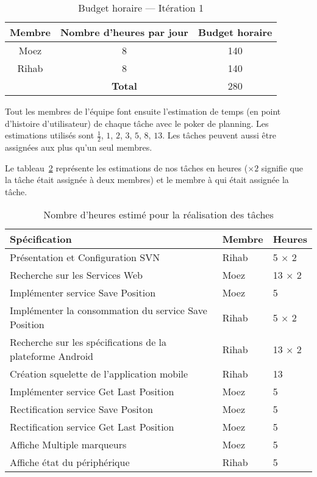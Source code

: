\begin{table}[H]
    \centering
    \begin{tabular}{| c | c | c |}
        \hline
        \textbf{Membre} & \textbf{Nombre d'heures par jour} & \textbf{Budget horaire} \\ \hline
        \hline

Moez & 8 & 140\\ \hline
Rihab & 8 & 140 \\ \hline
\multicolumn{1}{c|}{} & \textbf{Total} & 280 \\ \cline{2-3}
    \end{tabular}
    \caption{Budget horaire --- Itération 1}
\label{tab:sprint1-capacity}
\end{table}

Tout les membres de l'équipe font ensuite l'estimation de temps (en point
d'histoire d'utilisateur) de chaque tâche avec le poker de planning. Les
estimations utilisés sont $\frac{1}{2}$, $1$, $2$, $3$, $5$, $8$, $13$. Les
tâches peuvent aussi être assignées aux plus qu'un seul membres.

Le tableau~\ref{tab:sprint1-estimation} représente les estimations de nos
tâches en heures ($\times2$ signifie que la tâche était assignée à deux membres)
et le membre à qui était assignée la tâche.

\begin{table}[H]
    \begin{tabular}{| l | l | l |}
        \hline
        \textbf{Spécification} & \textbf{Membre} & \textbf{Heures} \\ \hline
        \hline
Présentation et Configuration SVN & Rihab & 5 $\times$ 2 \\ \hline
Recherche sur les Services Web & Moez & 13 $\times$ 2 \\ \hline
Implémenter service Save Position & Moez & 5 \\ \hline
Implémenter la consommation du service Save Position & Rihab & 5 $\times$ 2 \\ \hline
Recherche sur les spécifications de la plateforme Android & Rihab & 13 $\times$ 2 \\ \hline
Création squelette de l'application mobile & Rihab & 13 \\ \hline
Implémenter service Get Last Position & Moez & 5 \\ \hline
Rectification service Save Positon & Moez & 5 \\ \hline
Rectification service Get Last Position & Moez & 5 \\ \hline
Affiche Multiple marqueurs & Moez & 5 \\ \hline
Affiche état du périphérique & Rihab & 5 \\ \hline
    \end{tabular}
        \caption{Nombre d'heures estimé pour la réalisation des tâches}
\label{tab:sprint1-estimation}
\end{table}

